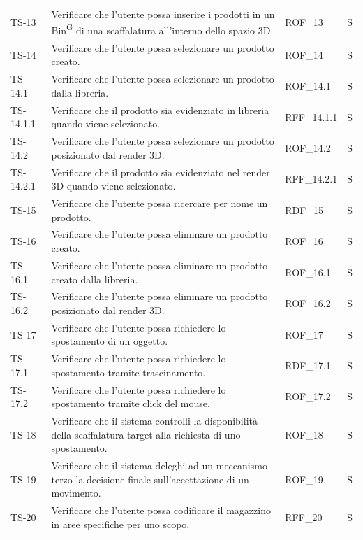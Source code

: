 \begin{xltabular}{0.9\textwidth}{X | p{0.5\textwidth} | X | X}
    TS-13 & Verificare che l'utente possa inserire i prodotti in un Bin\textsuperscript{G} di una scaffalatura all'interno dello spazio 3D. & ROF\_13& S\\
    TS-14 & Verificare che l'utente possa selezionare un prodotto creato. & ROF\_14 & S\\
    TS-14.1 & Verificare che l'utente possa selezionare un prodotto dalla libreria. & ROF\_14.1& S\\
    TS-14.1.1 & Verificare che il prodotto sia evidenziato in libreria quando viene selezionato. & RFF\_14.1.1& S \\
    TS-14.2 & Verificare che l'utente possa selezionare un prodotto posizionato dal render 3D. & ROF\_14.2& S\\
    TS-14.2.1 & Verificare che il prodotto sia evidenziato nel render 3D quando viene selezionato. & RFF\_14.2.1& S\\
    TS-15 & Verificare che l'utente possa ricercare per nome un prodotto. & RDF\_15& S\\
    TS-16& Verificare che l'utente possa eliminare un prodotto creato. & ROF\_16& S\\
    TS-16.1 & Verificare che l'utente possa eliminare un prodotto creato dalla libreria. & ROF\_16.1& S \\
    TS-16.2 & Verificare che l'utente possa eliminare un prodotto posizionato dal render 3D. & ROF\_16.2& S \\
    TS-17& Verificare che l'utente possa richiedere lo spostamento di un oggetto. & ROF\_17& S\\
    TS-17.1 & Verificare che l'utente possa richiedere lo spostamento tramite trascinamento. & RDF\_17.1& S\\
    TS-17.2 & Verificare che l'utente possa richiedere lo spostamento tramite click del mouse. & ROF\_17.2& S\\
    TS-18 & Verificare che il sistema controlli la disponibilità della scaffalatura target alla richiesta di uno spostamento. & ROF\_18& S\\
    TS-19  & Verificare che il sistema deleghi ad un meccanismo terzo la decisione finale sull'accettazione di un movimento. & ROF\_19& S\\
    TS-20  & Verificare che l'utente possa codificare il magazzino in aree specifiche per uno scopo. & RFF\_20 & S \\
    \hline
\end{xltabular}

